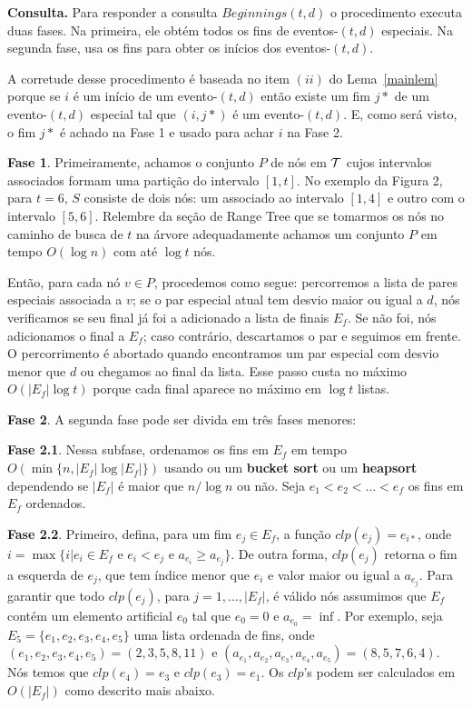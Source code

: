 \documentclass[12pt]{article}
\begin{document}
\textbf{Consulta.}
Para responder a consulta $Beginnings(t,d)$ o procedimento executa duas fases. Na primeira, 
ele obtém todos os fins de eventos-$(t,d)$ especiais. Na segunda fase, usa os fins para obter
os inícios dos eventos-$(t,d)$.

A corretude desse procedimento é baseada no item $(ii)$ do Lema~\ref{mainlem} porque se $i$ é um
início de um evento-$(t,d)$ então existe um fim $j*$ de um evento-$(t,d)$ especial tal que $(i, j*)$
é um evento-$(t,d)$. E, como será visto, o fim $j*$ é achado na Fase 1 e usado para achar $i$ na Fase 2.

\textbf{Fase 1}. Primeiramente, achamos o conjunto $P$ de nós em ${\cal T}$ cujos intervalos associados
formam uma partição do intervalo $[1, t]$. No exemplo da Figura 2, para $t = 6$, $S$ consiste de 
dois nós: um associado ao intervalo $[1, 4]$ e outro com o intervalo $[5, 6]$. Relembre da seção
de Range Tree que se tomarmos os nós no caminho de busca de $t$ na árvore adequadamente 
achamos um conjunto $P$ em tempo $O(\log n)$ com até $\log t$ nós.
 
Então, para cada nó $v \in P$,  procedemos como segue: percorremos a lista de pares especiais associada
a $v$; se o par especial atual tem desvio maior ou igual a $d$, nós verificamos se seu final já foi a adicionado a lista de finais $E_f$.
 Se não foi, nós adicionamos o final a $E_f$; caso contrário, descartamos o par e seguimos em frente.
  O percorrimento é abortado quando encontramos um par especial com desvio menor que $d$
ou chegamos ao final da lista. Esse passo custa no máximo $O(|E_f| \log t)$ porque cada final aparece no máximo
em $\log t$ listas.

\textbf{Fase 2}. A segunda fase pode ser divida em três fases menores:

\textbf{Fase 2.1}. Nessa subfase, ordenamos os fins em $E_f$ em tempo $O(\min\{n, |E_f|\log|E_f|\})$  
usando ou um \textbf{bucket sort} ou um \textbf{heapsort} dependendo se $|E_f|$ é maior que $n/\log n$ ou
não. Seja $e_1 < e_2 < \ldots < e_f$ os fins em $E_f$ ordenados.

\textbf{Fase 2.2}. Primeiro, defina, para um fim $e_j \in E_f$, a função $clp(e_j) = e_{i*}$,
onde $i = \max\{i|e_i \in E_f \text{ e } e_i < e_j \text{ e } a_{e_i} \ge a_{e_j}\}$. De outra forma,
$clp(e_j)$ retorna o fim a esquerda de $e_j$, que tem índice menor que $e_i$ e valor maior ou 
igual a $a_{e_j}$. Para garantir que todo $clp(e_j)$, para $j = 1, \ldots, |E_f|$, é válido nós
assumimos que $E_f$ contém um elemento artificial $e_0$ tal que $e_0 = 0$ e $a_{e_0} = \inf$.
Por exemplo, seja $E_5 = \{e_1, e_2, e_3, e_4, e_5\}$ uma lista ordenada de fins, onde 
$(e_1, e_2, e_3, e_4, e_5) = (2,3,5,8, 11)$ e $(a_{e_1}, a_{e_2}, a_{e_3}, a_{e_4}, a_{e_5}) = (8,5,7,6,4)$.
Nós temos que $clp(e_4) = e_3$ e $clp(e_3) = e_1$. Os $clp$'s podem ser calculados em $O(|E_f|)$ como
descrito mais abaixo. 
\end{document}
